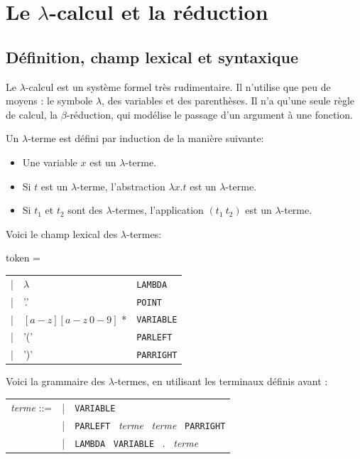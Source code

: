\chapter{Le $\lambda$-calcul et la réduction}

\section{Définition, champ lexical et syntaxique}
Le $\lambda$-calcul est un système formel très rudimentaire. Il n'utilise que  
peu de moyens : le symbole $\lambda$, des variables et des parenthèses. Il n'a
qu'une seule règle de calcul, la $\beta$-réduction, qui modélise le passage d'un
argument à une fonction.

\begin{definition}
Un $\lambda $-terme est défini par induction de la manière suivante:
\begin{itemize}
  \item Une  variable $x$ est un $\lambda$-terme.
  \item Si $t$ est un $\lambda$-terme, l'abstraction $\lambda x.t$ est un $\lambda$-terme.
  \item Si $t_1$ et $t_2$ sont des $\lambda$-termes, l'application $(t_1 \ t_2)$ est un $\lambda$-terme.
\end{itemize}
\end{definition}

Voici le champ lexical des $\lambda $-termes:

\vspace{0.2cm}
token = \begin{tabular}{lll}
| & $\lambda$  & 	{ \verb+LAMBDA+ } \\
| & '.' &  { \verb+POINT+ } \\
| & $[ a-z ] [ a-z\  0-9 ]$ * & { \verb+VARIABLE+ } \\
| & '('	 &	{ \verb+PARLEFT+ } \\
| & ')'	 &	{ \verb+PARRIGHT+ }
\end{tabular}
\vspace{0.4cm}

Voici la grammaire des $\lambda $-termes, en utilisant les terminaux définis
avant :

\vspace{0.2cm}
\begin{tabular}{lll}
\textit{terme} ::= & | & \verb+VARIABLE+  \\
& | & \verb+PARLEFT+ \ \textit{terme} \ \textit{terme} \ \verb+PARRIGHT+ \\
& |& \verb+LAMBDA+ \ \verb+VARIABLE+ \  . \ \textit{terme}
\end{tabular}
\vspace{0.2cm}


